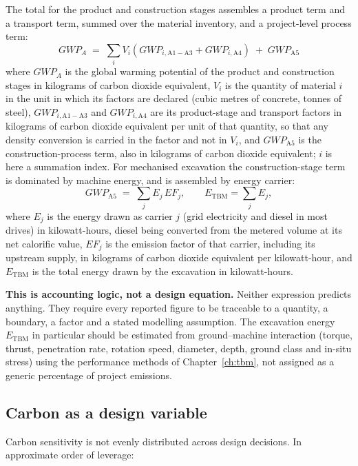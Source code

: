 The total for the product and construction stages assembles a product term
and a transport term, summed over the material inventory, and a project-level
process term:
\[
GWP_A \;=\; \sum_i V_i \left( GWP_{i,\mathrm{A1-A3}} + GWP_{i,\mathrm{A4}} \right)
\;+\; GWP_{\mathrm{A5}}
\]
where $GWP_A$ is the global warming potential of the product and construction
stages in
kilograms of carbon dioxide equivalent, $V_i$ is the quantity of material $i$
in the unit in which its factors are declared (cubic metres of concrete,
tonnes of steel), $GWP_{i,\mathrm{A1-A3}}$ and $GWP_{i,\mathrm{A4}}$ are its
product-stage and transport factors in kilograms of carbon dioxide equivalent
per unit of that quantity, so that any density conversion is carried in the
factor and not in $V_i$, and $GWP_{\mathrm{A5}}$ is the construction-process
term, also in kilograms of carbon dioxide equivalent; $i$ is here a summation
index. For mechanised excavation the
construction-stage term is dominated by machine energy, and is assembled by
energy carrier:
\[
GWP_{\mathrm{A5}} \;=\; \sum_j E_j\, EF_j ,
\qquad E_{\mathrm{TBM}} = \sum_j E_j ,
\]
where $E_j$ is the energy drawn as carrier $j$ (grid electricity and
diesel in most drives) in kilowatt-hours, diesel being converted from the
metered volume at its net calorific value, $EF_j$ is the emission factor of
that carrier, including its upstream supply, in kilograms of carbon dioxide
equivalent per kilowatt-hour, and $E_{\mathrm{TBM}}$ is the total energy
drawn by the excavation in kilowatt-hours.

\noindent\textbf{This is accounting logic, not a design equation.}\enspace
Neither expression predicts anything. They require every
reported figure to be traceable to a quantity, a boundary, a factor and a
stated modelling assumption. The excavation energy $E_{\mathrm{TBM}}$ in
particular should be estimated from ground--machine interaction (torque,
thrust, penetration rate, rotation speed, diameter, depth, ground class and
in-situ stress) using the performance methods of
Chapter~\ref{ch:tbm}, not assigned as a generic percentage of project
emissions.

\subsection{Carbon as a design variable}
\label{sec:carbon-hierarchy}

Carbon sensitivity is not evenly distributed across design decisions. In
approximate order of leverage:

